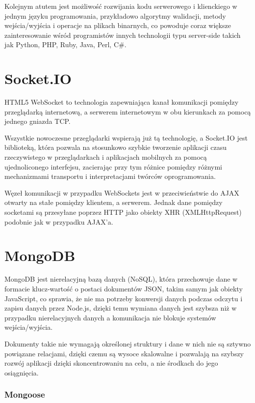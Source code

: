 \documentclass[twoside,a4paper]{book}
\begin{document}
Kolejnym atutem jest możliwość rozwijania kodu serwerowego i klienckiego w jednym języku programowania, przykładowo algorytmy walidacji, metody wejścia/wyjścia i operacje na plikach binarnych, co powoduje coraz większe zainteresowanie wśród programistów innych technologii typu server-side takich jak Python, PHP, Ruby, Java, Perl, C\#.


\section{Socket.IO}

HTML5 WebSocket to technologia zapewniająca kanał komunikacji pomiędzy przeglądarką internetową, a serwerem internetowym w obu kierunkach za pomocą jednego gniazda TCP.

Wszystkie nowoczesne przeglądarki wspierają już tą technologię, a Socket.IO jest biblioteką, która pozwala na stosunkowo szybkie tworzenie aplikacji czasu rzeczywistego w przeglądarkach i aplikacjach mobilnych za pomocą ujednoliconego interfejsu, zacierając przy tym różnice pomiędzy różnymi mechanizmami transportu i interpretacjami twórców oprogramowania.

Węzeł komunikacji w przypadku WebSockets jest w przeciwieństwie do AJAX otwarty na stałe pomiędzy klientem, a serwerem. Jednak dane pomiędzy socketami są przesyłane poprzez HTTP jako obiekty XHR (XMLHttpRequest) podobnie jak w przypadku AJAX'a.


\section{MongoDB}

MongoDB jest nierelacyjną bazą danych (NoSQL), która przechowuje dane w formacie klucz-wartość o postaci dokumentów JSON, takim samym jak obiekty JavaScript, co sprawia, że nie ma potrzeby konwersji danych podczas odczytu i zapisu danych przez Node.js, dzięki temu wymiana danych jest szybsza niż w przypadku nierelacyjnych danych a komunikacja nie blokuje systemów wejścia/wyjścia.

Dokumenty takie nie wymagają określonej struktury i dane w nich nie są sztywno powiązane relacjami, dzięki czemu są wysoce skalowalne i pozwalają na szybszy rozwój aplikacji dzięki skoncentrowaniu na celu, a nie środkach do jego osiągnięcia.

\subsubsection{Mongoose}
\end{document}
